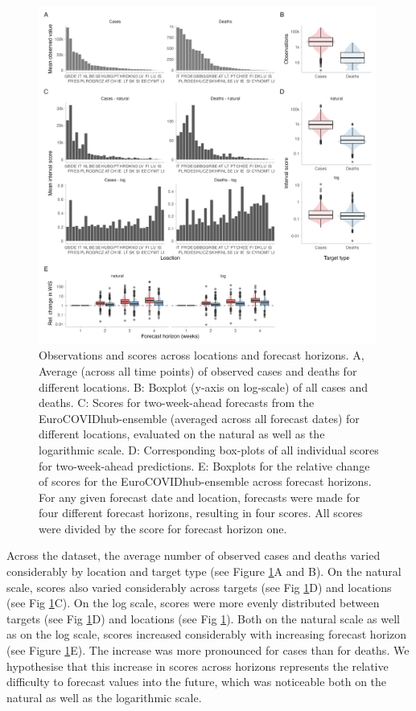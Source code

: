 \documentclass{article}
\begin{document}
\begin{figure}[h!]
    \centering
    \includegraphics[width=0.99\textwidth]{output/figures/HUB-mean-obs-location.png}
    \caption{Observations and scores across locations and forecast horizons. A, Average (across all time points) of observed cases and deaths for different locations. B: Boxplot (y-axis on log-scale) of all cases and deaths. C: Scores for two-week-ahead forecasts from the EuroCOVIDhub-ensemble (averaged across all forecast dates) for different locations, evaluated on the natural as well as the logarithmic scale. D: Corresponding box-plots of all individual scores for two-week-ahead predictions. E: Boxplots for the relative change of scores for the EuroCOVIDhub-ensemble across forecast horizons. For any given forecast date and location, forecasts were made for four different forecast horizons, resulting in four scores. All scores were divided by the score for forecast horizon one.}
    \label{fig:HUB-mean-locations}
\end{figure}

Across the dataset, the average number of observed cases and deaths varied considerably by location and target type (see Figure \ref{fig:HUB-mean-locations}A and B). On the natural scale, scores also varied considerably across targets (see Fig \ref{fig:HUB-mean-locations}D) and locations (see Fig \ref{fig:HUB-mean-locations}C). On the log scale, scores were more evenly distributed between targets (see Fig \ref{fig:HUB-mean-locations}D) and locations (see Fig \ref{fig:HUB-mean-locations}). Both on the natural scale as well as on the log scale, scores increased considerably with increasing forecast horizon (see Figure \ref{fig:HUB-mean-locations}E). The increase was more pronounced for cases than for deaths. We hypothesise that this increase in scores across horizons represents the relative difficulty to forecast values into the future, which was noticeable both on the natural as well as the logarithmic scale. 
\end{document}
